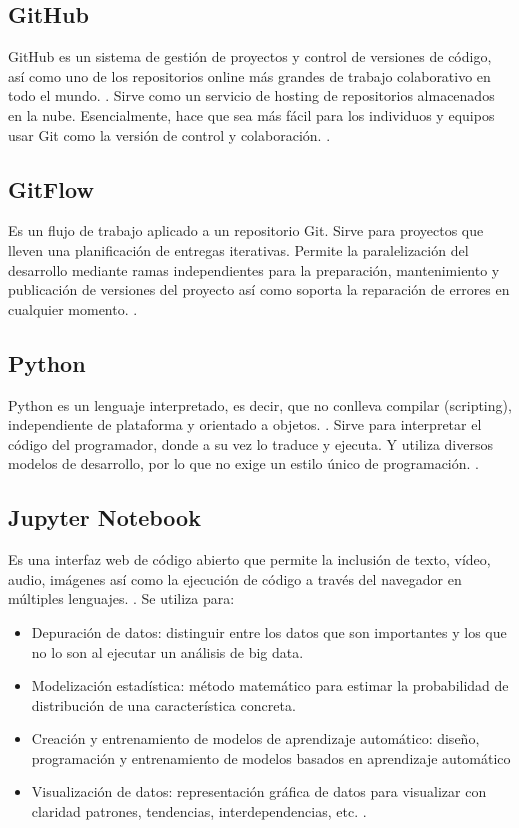 \documentclass[12pt,letterpaper]{article}
\begin{document}
\subsection*{GitHub}
GitHub es un sistema de gesti\'on de proyectos y control de versiones de c\'odigo, as\'i como uno de los repositorios online m\'as grandes de trabajo colaborativo en todo el mundo.
 \cite[(Hostinger Tutoriales. 2019)]{ref5}.
Sirve como un servicio de hosting de repositorios almacenados en la nube. Esencialmente, hace que sea m\'as f\'acil para los individuos y equipos usar Git como la versi\'on de control y colaboraci\'on.
\cite[(Kinsta. 2020)]{ref6}.

\subsection*{GitFlow}
Es un flujo de trabajo aplicado a un repositorio Git. 
Sirve para proyectos que lleven una planificaci\'on de entregas iterativas. Permite la paralelización del desarrollo mediante ramas independientes para la preparaci\'on, mantenimiento y publicaci\'on de versiones del proyecto as\'i como soporta la reparaci\'on de errores en cualquier momento.
\cite[(Claventy. 2020)]{ref7}.

\subsection*{Python}
Python es un lenguaje interpretado, es decir, que no conlleva compilar (scripting), independiente de plataforma y orientado a objetos. 
\cite[(Desarrollo Web. 2003)]{ref8}.
Sirve para interpretar el c\'odigo del programador, donde a su vez lo traduce y ejecuta. Y utiliza diversos modelos de desarrollo, por lo que no exige un estilo \'unico de programaci\'on.
\cite[(Angeles, J. 2020)]{ref9}.


\subsection*{Jupyter Notebook}
Es una interfaz web de c\'odigo abierto que permite la inclusi\'on de texto, v\'ideo, audio, im\'agenes as\'i como la ejecuci\'on de c\'odigo a trav\'es del navegador en m\'ultiples lenguajes. 
\cite[(Cabrera, E. y Diaz, E. s.f.)]{ref10}.
Se utiliza para: 
\begin{itemize}
\item Depuraci\'on de datos: distinguir entre los datos que son importantes y los que no lo son al ejecutar un an\'alisis de big data.
\item Modelizaci\'on estad\'istica: m\'etodo matem\'atico para estimar la probabilidad de distribuci\'on de una caracter\'istica concreta.
\item Creaci\'on y entrenamiento de modelos de aprendizaje autom\'atico: diseño, programaci\'on y entrenamiento de modelos basados en aprendizaje autom\'atico
\item Visualizaci\'on de datos: representaci\'on gr\'afica de datos para visualizar con claridad patrones, tendencias, interdependencias, etc.
\cite[(Digital Guide IONOS. s.f.)]{ref11}.
\end{itemize}
\end{document}
